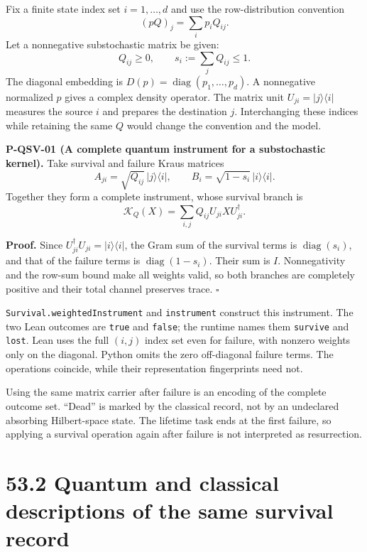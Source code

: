 \documentclass[
  11pt,
  oneside]{book}
\begin{document}
Fix a finite state index set \(i=1,\ldots,d\) and use the
row-distribution convention \[
(pQ)_j=\sum_i p_iQ_{ij}.
\] Let a nonnegative substochastic matrix be given: \[
Q_{ij}\ge0,\qquad s_i:=\sum_jQ_{ij}\le1.
\] The diagonal embedding is
\(D(p)=\operatorname{diag}(p_1,\ldots,p_d)\). A nonnegative normalized
\(p\) gives a complex density operator. The matrix unit
\(U_{ji}=|j\rangle\langle i|\) measures the source \(i\) and prepares
the destination \(j\). Interchanging these indices while retaining the
same \(Q\) would change the convention and the model.

\label{p-qsv-01}{}

\textbf{P-QSV-01 (A complete quantum instrument for a substochastic
kernel).} Take survival and failure Kraus matrices \[
A_{ji}=\sqrt{Q_{ij}}\,|j\rangle\langle i|,
\qquad B_i=\sqrt{1-s_i}\,|i\rangle\langle i|.
\] Together they form a complete instrument, whose survival branch is \[
\mathcal K_Q(X)=\sum_{i,j}Q_{ij}U_{ji}XU_{ji}^{\dagger}.
\]

\textbf{Proof.} Since \(U_{ji}^{\dagger}U_{ji}=|i\rangle\langle i|\),
the Gram sum of the survival terms is \(\operatorname{diag}(s_i)\), and
that of the failure terms is \(\operatorname{diag}(1-s_i)\). Their sum
is \(I\). Nonnegativity and the row-sum bound make all weights valid, so
both branches are completely positive and their total channel preserves
trace. \(\square\)

\texttt{Survival.\allowbreak weighted\allowbreak Instrument} and \texttt{instrument} construct
this instrument. The two Lean outcomes are \texttt{true} and
\texttt{false}; the runtime names them \texttt{survive} and
\texttt{lost}. Lean uses the full \((i,j)\) index set even for failure,
with nonzero weights only on the diagonal. Python omits the zero
off-diagonal failure terms. The operations coincide, while their
representation fingerprints need not.

Using the same matrix carrier after failure is an encoding of the
complete outcome set. ``Dead'' is marked by the classical record, not by
an undeclared absorbing Hilbert-space state. The lifetime task ends at
the first failure, so applying a survival operation again after failure
is not interpreted as resurrection.

\section{53.2 Quantum and classical descriptions of the same survival
record}
\end{document}
